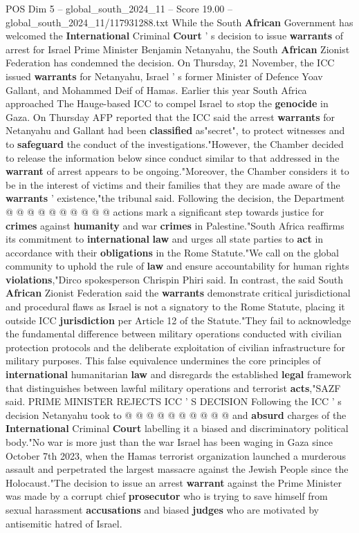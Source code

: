 \begin{textsample}{POS Dim 5 – global\_south\_2024\_11 – Score 19.00 – global\_south\_2024\_11/117931288.txt}  \label{ex:f5_pos_025}
While the South \textbf{African} Government has welcomed the \textbf{International} Criminal \textbf{Court} ' s decision to issue \textbf{warrants} of arrest for Israel Prime Minister Benjamin Netanyahu, the South \textbf{African} Zionist Federation has condemned the decision.
On Thursday, 21 November, the ICC issued \textbf{warrants} for Netanyahu, Israel ' s former Minister of Defence Yoav Gallant, and Mohammed Deif of Hamas.
Earlier this year South Africa approached The Hauge-based ICC to compel Israel to stop the \textbf{genocide} in Gaza.
On Thursday AFP reported that the ICC said the arrest \textbf{warrants} for Netanyahu and Gallant had been \textbf{classified} as"secret", to protect witnesses and to \textbf{safeguard} the conduct of the investigations."However, the Chamber decided to release the information below since conduct similar to that addressed in the \textbf{warrant} of arrest appears to be ongoing."Moreover, the Chamber considers it to be in the interest of victims and their families that they are made aware of the \textbf{warrants} ' existence,"the tribunal said.
Following the decision, the Department @ @ @ @ @ @ @ @ @ @ actions mark a significant step towards justice for \textbf{crimes} against \textbf{humanity} and war \textbf{crimes} in Palestine."South Africa reaffirms its commitment to \textbf{international} \textbf{law} and urges all state parties to \textbf{act} in accordance with their \textbf{obligations} in the Rome Statute."We call on the global community to uphold the rule of \textbf{law} and ensure accountability for human rights \textbf{violations},"Dirco spokesperson Chrispin Phiri said.
In contrast, the said South \textbf{African} Zionist Federation said the \textbf{warrants} demonstrate critical jurisdictional and procedural flaws as Israel is not a signatory to the Rome Statute, placing it outside ICC \textbf{jurisdiction} per Article 12 of the Statute."They fail to acknowledge the fundamental difference between military operations conducted with civilian protection protocols and the deliberate exploitation of civilian infrastructure for military purposes.
This false equivalence undermines the core principles of \textbf{international} humanitarian \textbf{law} and disregards the established \textbf{legal} framework that distinguishes between lawful military operations and terrorist \textbf{acts},"SAZF said.
PRIME MINISTER REJECTS ICC ' S DECISION Following the ICC ' s decision Netanyahu took to @ @ @ @ @ @ @ @ @ @ and \textbf{absurd} charges of the \textbf{International} Criminal \textbf{Court} labelling it a biased and discriminatory political body."No war is more just than the war Israel has been waging in Gaza since October 7th 2023, when the Hamas terrorist organization launched a murderous assault and perpetrated the largest massacre against the Jewish People since the Holocaust."The decision to issue an arrest \textbf{warrant} against the Prime Minister was made by a corrupt chief \textbf{prosecutor} who is trying to save himself from sexual harassment \textbf{accusations} and biased \textbf{judges} who are motivated by antisemitic hatred of Israel.

\end{textsample}
